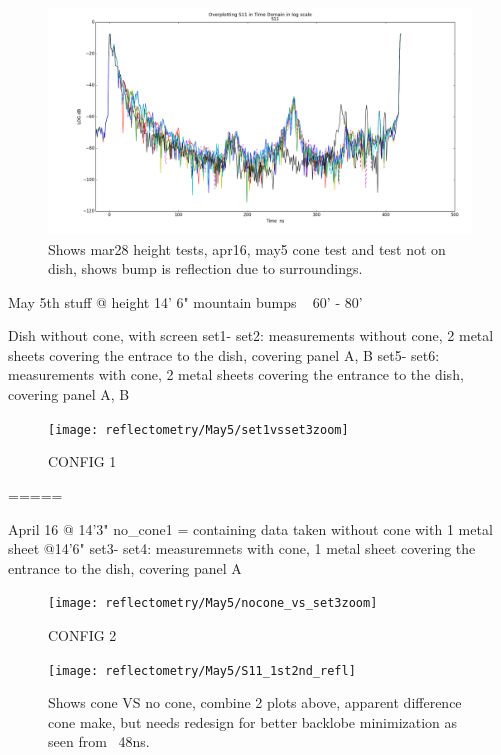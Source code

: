 \documentclass[preprint]{aastex}  %
\begin{document}
\begin{figure}[H]
	\begin{center}
	\includegraphics[width =\textwidth]{reflectometry_plots/Mar28/s11all-mar28mix17set1}
	\caption{Shows mar28 height tests, apr16, may5 cone test and test not on dish, shows bump is reflection due to surroundings.
\label{Fig:} }
	\end{center}
\end{figure}

May 5th stuff
@ height 14' 6"
mountain bumps ~ 60' - 80'

Dish without cone, with screen
set1- set2: measurements without cone, 2 metal sheets covering the entrace to the dish, covering panel A, B
set5- set6: measurements with cone, 2 metal sheets covering the entrance to the dish, covering panel A, B

\begin{figure}[H]
	\begin{center}
	\texttt{[image: reflectometry/May5/set1vsset3zoom]}
	\caption{CONFIG 1
\label{Fig:} }
	\end{center}
\end{figure}
=====

April 16
@ 14'3" 
no_cone1 = containing data taken without cone with 1 metal sheet
@14'6"
set3- set4: measuremnets with cone, 1 metal sheet covering the entrance to the dish, covering panel A
\begin{figure}[H]
	\begin{center}
	\texttt{[image: reflectometry/May5/nocone\_vs\_set3zoom]}
	\caption{CONFIG 2
\label{Fig:} }
	\end{center}
\end{figure}

\begin{figure}[H]
	\begin{center}
	\texttt{[image: reflectometry/May5/S11\_1st2nd\_refl]}
	\caption{Shows cone VS no cone, combine 2 plots above, apparent difference cone make, but needs redesign for better backlobe minimization as seen from ~48ns.
\label{Fig:} }
	\end{center}
\end{figure}
\end{document}
